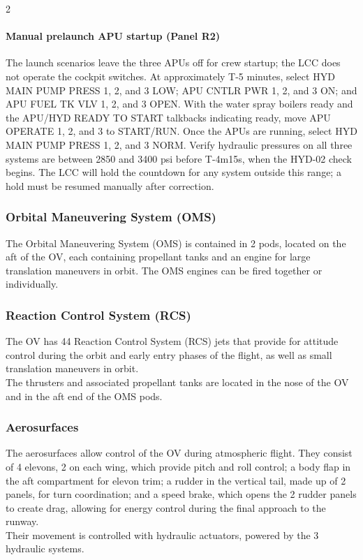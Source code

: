 \documentclass[Space_Shuttle_Vessel_Manual.tex]{subfiles}
\begin{document}
\begin{multicols*}{2}
\paragraph{Manual prelaunch APU startup (Panel R2)}
The launch scenarios leave the three APUs off for crew startup; the LCC does not operate the cockpit switches. At approximately T-5 minutes, select HYD MAIN PUMP PRESS 1, 2, and 3 LOW; APU CNTLR PWR 1, 2, and 3 ON; and APU FUEL TK VLV 1, 2, and 3 OPEN. With the water spray boilers ready and the APU/HYD READY TO START talkbacks indicating ready, move APU OPERATE 1, 2, and 3 to START/RUN. Once the APUs are running, select HYD MAIN PUMP PRESS 1, 2, and 3 NORM. Verify hydraulic pressures on all three systems are between 2850 and 3400 psi before T-4m15s, when the HYD-02 check begins. The LCC will hold the countdown for any system outside this range; a hold must be resumed manually after correction.



\subsubsection{Orbital Maneuvering System (OMS)}
The Orbital Maneuvering System (OMS) is contained in 2 pods, located on the aft of the OV, each containing propellant tanks and an engine for large translation maneuvers in orbit. The OMS engines can be fired together or individually.


\subsubsection{Reaction Control System (RCS)}
The OV has 44 Reaction Control System (RCS) jets that provide for attitude control during the orbit and early entry phases of the flight, as well as small translation maneuvers in orbit.\\
The thrusters and associated propellant tanks are located in the nose of the OV and in the aft end of the OMS pods.


\subsubsection{Aerosurfaces}
The aerosurfaces allow control of the OV during atmospheric flight. They consist of 4 elevons, 2 on each wing, which provide pitch and roll control; a body flap in the aft compartment for elevon trim; a rudder in the vertical tail, made up of 2 panels, for turn coordination; and a speed brake, which opens the 2 rudder panels to create drag, allowing for energy control during the final approach to the runway.\\
Their movement is controlled with hydraulic actuators, powered by the 3 hydraulic systems.



\end{multicols*}
\end{document}
